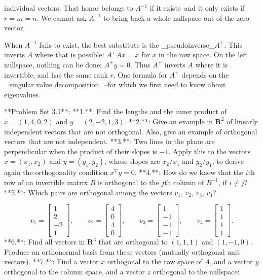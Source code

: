individual vectors. That honor belongs to \(A^{-1}\) if it exists--and it only exists if \(r=m=n\). We cannot ask \(A^{-1}\) to bring back a whole nullspace out of the zero vector.

When \(A^{-1}\) fails to exist, the best substitute is the _pseudoinverse_\(A^{+}\). This inverts \(A\) where that is possible: \(A^{+}Ax=x\) for \(x\) in the row space. On the left nullspace, nothing can be done: \(A^{+}y=0\). Thus \(A^{+}\) inverts \(A\) where it is invertible, and has the same rank \(r\). One formula for \(A^{+}\) depends on the _singular value decomposition_--for which we first need to know about eigenvalues.

**Problem Set 3.1**:
**1.**: Find the lengths and the inner product of \(x=(1,4,0,2)\) and \(y=(2,-2,1,3)\).
**2.**: Give an example in \(\mathbf{R}^{2}\) of linearly independent vectors that are not orthogonal. Also, give an example of orthogonal vectors that are not independent.
**3.**: Two lines in the plane are perpendicular when the product of their slopes is \(-1\). Apply this to the vectors \(x=(x_{1},x_{2})\) and \(y=(y_{1},y_{2})\), whose slopes are \(x_{2}/x_{1}\) and \(y_{2}/y_{1}\), to derive again the orthogonality condition \(x^{\mathrm{T}}y=0\).
**4.**: How do we know that the \(i\)th row of an invertible matrix \(B\) is orthogonal to the \(j\)th column of \(B^{-1}\), if \(i\neq j\)?
**5.**: Which pairs are orthogonal among the vectors \(v_{1}\), \(v_{2}\), \(v_{3}\), \(v_{4}\)?

\[v_{1}=\begin{bmatrix}1\\ 2\\ -2\\ 1\end{bmatrix},\qquad v_{2}=\begin{bmatrix}4\\ 0\\ 4\\ 0\end{bmatrix},\qquad v_{3}=\begin{bmatrix}1\\ -1\\ -1\\ -1\end{bmatrix},\qquad v_{4}=\begin{bmatrix}1\\ 1\\ 1\\ 1\end{bmatrix}.\]
**6.**: Find all vectors in \(\mathbf{R}^{3}\) that are orthogonal to \((1,1,1)\) and \((1,-1,0)\). Produce an orthonormal basis from these vectors (mutually orthogonal unit vectors).
**7.**: Find a vector \(x\) orthogonal to the row space of \(A\), and a vector \(y\) orthogonal to the column space, and a vector \(z\) orthogonal to the nullspace:

